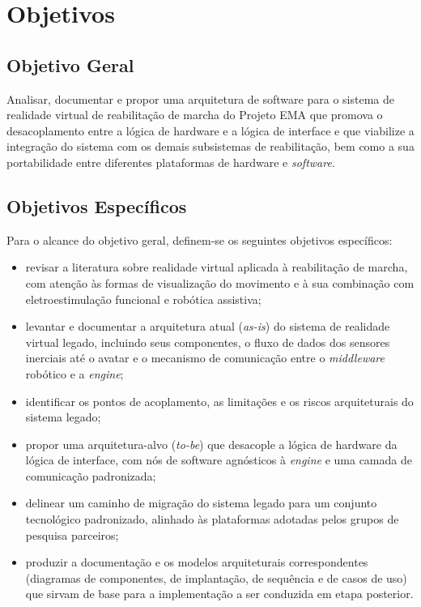 \section{Objetivos}

\subsection{Objetivo Geral}

Analisar, documentar e propor uma arquitetura de software para o sistema de realidade
virtual de reabilitação de marcha do Projeto EMA que promova o desacoplamento entre a
lógica de hardware e a lógica de interface e que viabilize a integração do sistema com
os demais subsistemas de reabilitação, bem como a sua portabilidade entre diferentes
plataformas de hardware e \emph{software}.

\subsection{Objetivos Específicos}

Para o alcance do objetivo geral, definem-se os seguintes objetivos específicos:

\begin{itemize}
	\item revisar a literatura sobre realidade virtual aplicada à reabilitação de
	      marcha, com atenção às formas de visualização do movimento e à sua combinação
	      com eletroestimulação funcional e robótica assistiva;
	\item levantar e documentar a arquitetura atual (\emph{as-is}) do sistema de
	      realidade virtual legado, incluindo seus componentes, o fluxo de dados dos
	      sensores inerciais até o avatar e o mecanismo de comunicação entre o
	      \emph{middleware} robótico e a \emph{engine};
	\item identificar os pontos de acoplamento, as limitações e os riscos
	      arquiteturais do sistema legado;
	\item propor uma arquitetura-alvo (\emph{to-be}) que desacople a lógica de hardware
	      da lógica de interface, com nós de software agnósticos à \emph{engine} e uma
	      camada de comunicação padronizada;
	\item delinear um caminho de migração do sistema legado para um conjunto
	      tecnológico padronizado, alinhado às plataformas adotadas pelos grupos de
	      pesquisa parceiros;
	\item produzir a documentação e os modelos arquiteturais correspondentes
	      (diagramas de componentes, de implantação, de sequência e de casos de uso) que
	      sirvam de base para a implementação a ser conduzida em etapa posterior.
\end{itemize}

